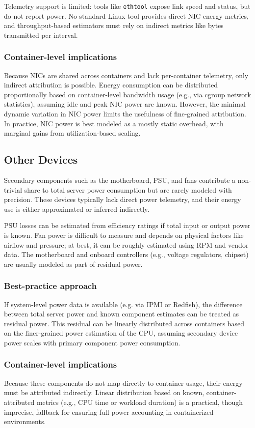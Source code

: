 Telemetry support is limited: tools like \texttt{ethtool} expose link speed and status, but do not report power. No standard Linux tool provides direct NIC energy metrics, and throughput-based estimators must rely on indirect metrics like bytes transmitted per interval.

\subsubsection{Container-level implications}
Because NICs are shared across containers and lack per-container telemetry, only indirect attribution is possible. Energy consumption can be distributed proportionally based on container-level bandwidth usage (e.g., via cgroup network statistics), assuming idle and peak NIC power are known. However, the minimal dynamic variation in NIC power limits the usefulness of fine-grained attribution. In practice, NIC power is best modeled as a mostly static overhead, with marginal gains from utilization-based scaling.

\subsection{Other Devices}

Secondary components such as the motherboard, PSU, and fans contribute a non-trivial share to total server power consumption but are rarely modeled with precision. These devices typically lack direct power telemetry, and their energy use is either approximated or inferred indirectly.

PSU losses can be estimated from efficiency ratings if total input or output power is known. Fan power is difficult to measure and depends on physical factors like airflow and pressure; at best, it can be roughly estimated using RPM and vendor data. The motherboard and onboard controllers (e.g., voltage regulators, chipset) are usually modeled as part of residual power.

\subsubsection{Best-practice approach}
If system-level power data is available (e.g. via IPMI or Redfish), the difference between total server power and known component estimates can be treated as residual power. This residual can be linearly distributed across containers based on the finer-grained power estimation of the CPU, assuming secondary device power scales with primary component power consumption.

\subsubsection{Container-level implications}
Because these components do not map directly to container usage, their energy must be attributed indirectly. Linear distribution based on known, container-attributed metrics (e.g., CPU time or workload duration) is a practical, though imprecise, fallback for ensuring full power accounting in containerized environments.